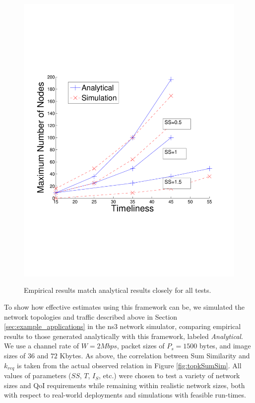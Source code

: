 \begin{figure}[]
{        \includegraphics[scale=0.40, clip=true, trim=12mm 65mm 20mm 65mm]{figures/scal_sim_results/grid_scal_anal_vs_sim_color.pdf}
        \label{fig:scal_vs_qoi_grid}
        }
   \caption{Empirical results match analytical results closely for all tests.}
   \label{fig:scal_vs_qoi}
\end{figure}

To show how effective estimates using this framework can be, we simulated the network topologies and traffic described above in Section \ref{sec:example_applications} in the ns3 network simulator, comparing empirical results to those generated analytically with this framework, labeled \emph{Analytical}.  
We use a channel rate of $W= 2 Mbps$, packet sizes of $P_s = 1500$ bytes, and image sizes of $36$ and $72$ Kbytes.  As above, the correlation between Sum Similarity and $k_{req}$ is taken from the actual observed relation in Figure \ref{fig:topkSumSim}.  All values of parameters ($SS$, $T$, $I_S$, etc.) were chosen to test a variety of network sizes and QoI requirements while remaining within realistic network sizes, both with respect to real-world deployments and simulations with feasible run-times.

